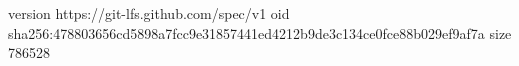 version https://git-lfs.github.com/spec/v1
oid sha256:478803656cd5898a7fcc9e31857441ed4212b9de3c134ce0fce88b029ef9af7a
size 786528
